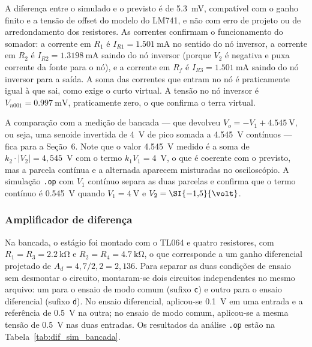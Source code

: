 \documentclass[11pt,a4paper]{article}
\begin{document}
A diferença entre o simulado e o previsto é de \SI{5,3}{\milli\volt}, compatível com o ganho finito e a tensão de offset do modelo do LM741, e não com erro de projeto ou de arredondamento dos resistores. As correntes confirmam o funcionamento do somador: a corrente em $R_1$ é $I_{R1} = \SI{1,501}{\milli\ampere}$ no sentido do nó inversor, a corrente em $R_2$ é $I_{R2} = \SI{1,3198}{\milli\ampere}$ saindo do nó inversor (porque $V_2$ é negativa e puxa corrente da fonte para o nó), e a corrente em $R_f$ é $I_{R3} = \SI{1,501}{\milli\ampere}$ saindo do nó inversor para a saída. A soma das correntes que entram no nó é praticamente igual à que sai, como exige o curto virtual. A tensão no nó inversor é $V_{n001} = \SI{0,997}{\milli\volt}$, praticamente zero, o que confirma o terra virtual.

A comparação com a medição de bancada — que devolveu $V_o = -V_1 + \SI{4,545}{\volt}$, ou seja, uma senoide invertida de \SI{4}{\volt} de pico somada a \SI{4,545}{\volt} contínuos — fica para a Seção~6. Note que o valor \SI{4,545}{\volt} medido é a soma de $k_2 \cdot |V_2| = 4{,}545$~V com o termo $k_1 V_1 = 4$~V, o que é coerente com o previsto, mas a parcela contínua e a alternada aparecem misturadas no osciloscópio. A simulação \texttt{.op} com $V_1$ contínuo separa as duas parcelas e confirma que o termo contínuo é \SI{0,545}{\volt} quando $V_1 = \SI{4}{\volt}$ e $V_2 = \SI{-1{,}5}{\volt}$.

\subsubsection{Amplificador de diferença}

Na bancada, o estágio foi montado com o TL064 e quatro resistores, com $R_1 = R_3 = \SI{2,2}{\kilo\ohm}$ e $R_2 = R_4 = \SI{4,7}{\kilo\ohm}$, o que corresponde a um ganho diferencial projetado de $A_d = 4{,}7/2{,}2 = 2{,}136$. Para separar as duas condições de ensaio sem desmontar o circuito, montaram-se dois circuitos independentes no mesmo arquivo: um para o ensaio de modo comum (sufixo \texttt{c}) e outro para o ensaio diferencial (sufixo \texttt{d}). No ensaio diferencial, aplicou-se \SI{0,1}{\volt} em uma entrada e a referência de \SI{0,5}{\volt} na outra; no ensaio de modo comum, aplicou-se a mesma tensão de \SI{0,5}{\volt} nas duas entradas. Os resultados da análise \texttt{.op} estão na Tabela~\ref{tab:dif_sim_bancada}.
\end{document}
